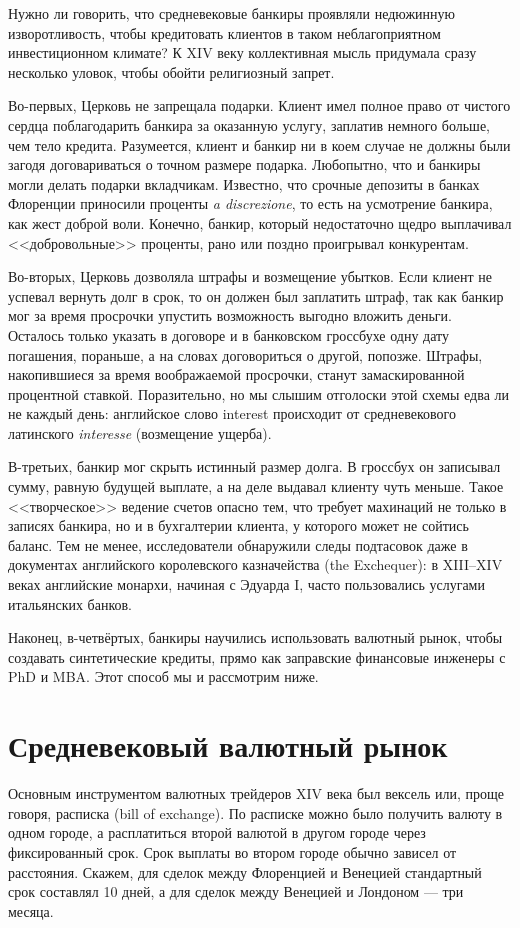 \documentclass[a4paper,14pt]{extarticle}
\newcommand{\foreign}[1]{\textit{#1}}
\newcommand{\english}[1]{#1}
\begin{document}
Нужно ли говорить, что средневековые банкиры проявляли недюжинную изворотливость, чтобы кредитовать клиентов в таком неблагоприятном инвестиционном климате? К XIV веку коллективная мысль придумала сразу несколько уловок, чтобы обойти религиозный запрет.

Во-первых, Церковь не запрещала подарки. Клиент имел полное право от чистого сердца поблагодарить банкира за оказанную услугу, заплатив немного больше, чем тело кредита. Разумеется, клиент и банкир ни в коем случае не должны были загодя договариваться о точном размере подарка. Любопытно, что и банкиры могли делать подарки вкладчикам. Известно, что срочные депозиты в банках Флоренции приносили проценты \foreign{a discrezione}, то есть на усмотрение банкира, как жест доброй воли. Конечно, банкир, который недостаточно щедро выплачивал <<добровольные>> проценты, рано или поздно проигрывал конкурентам.

Во-вторых, Церковь дозволяла штрафы и возмещение убытков. Если клиент не успевал вернуть долг в срок, то он должен был заплатить штраф, так как банкир мог за время просрочки упустить возможность выгодно вложить деньги. Осталось только указать в договоре и в банковском гроссбухе одну дату погашения, пораньше, а на словах договориться о другой, попозже. Штрафы, накопившиеся за время воображаемой просрочки, станут замаскированной процентной ставкой. Поразительно, но мы слышим отголоски этой схемы едва ли не каждый день: английское слово \english{interest} происходит от средневекового латинского \foreign{interesse} (возмещение ущерба).

В-третьих, банкир мог скрыть истинный размер долга. В гроссбух он записывал сумму, равную будущей выплате, а на деле выдавал клиенту чуть меньше. Такое <<творческое>> ведение счетов опасно тем, что требует махинаций не только в записях банкира, но и в бухгалтерии клиента, у которого может не сойтись баланс. Тем не менее, исследователи обнаружили следы подтасовок даже в документах английского королевского казначейства (\english{the Exchequer}): в XIII--XIV веках английские монархи, начиная с  Эдуарда I, часто пользовались услугами итальянских банков.

Наконец, в-четвёртых, банкиры научились использовать валютный рынок, чтобы создавать синтетические кредиты, прямо как заправские финансовые инженеры с PhD и MBA. Этот способ мы и рассмотрим ниже.

\section*{Средневековый валютный рынок}
Основным инструментом валютных трейдеров XIV века был вексель или, проще говоря, расписка (\english{bill of exchange}). По расписке можно было получить валюту в одном городе, а расплатиться второй валютой в другом городе через фиксированный срок. Срок выплаты во втором городе обычно зависел от расстояния. Скажем, для сделок между Флоренцией и Венецией стандартный срок составлял 10 дней, а для сделок между Венецией и Лондоном --- три месяца.
\end{document}
